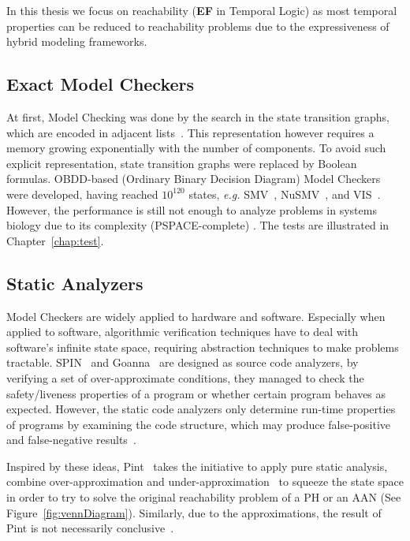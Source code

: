 In this thesis we focus on reachability (\textbf{EF} in Temporal Logic) as most temporal properties can be reduced to reachability problems due to the expressiveness of hybrid modeling frameworks.

\subsection{Exact Model Checkers}
At first, Model Checking was done by the search in the state transition graphs, which are encoded in adjacent lists~\cite{clarke1981design}.
This representation however requires a memory growing exponentially with the number of components.
To avoid such explicit representation, state transition graphs were replaced by Boolean formulas.
OBDD-based (Ordinary Binary Decision Diagram) Model Checkers were developed, having reached $10^{120}$ states, \textit{e.g.}
SMV~\cite{mcmillan1993symbolic}, NuSMV~\cite{cimatti2000nusmv}, and VIS~\cite{brayton1996vis}.
However, the performance is still not enough to analyze problems in systems biology due to its complexity (PSPACE-complete) \cite{harel2002complexity}.
The tests are illustrated in Chapter~\ref{chap:test}.  

\subsection{Static Analyzers}
Model Checkers are widely applied to hardware and software.
Especially when applied to software, algorithmic verification techniques have
to deal with software’s infinite state space, requiring abstraction techniques to make problems tractable.
SPIN~\cite{holzmann1997model} and Goanna~\cite{fehnker2006goanna} are designed as source code analyzers, by verifying a set of over-approximate conditions, they managed to check the safety/liveness properties of a program or whether certain program behaves as expected. 
However, the static code analyzers only determine run-time properties of programs by examining the code structure, which may produce false-positive and false-negative results~\cite{vorobyov2010comparing}.

Inspired by these ideas, Pint~\cite{Pint} takes the initiative to apply pure static analysis, combine over-approximation and under-approximation~\cite{pauleve2012} to squeeze the state space in order to try to solve the original reachability problem of a PH or an AAN (See Figure~\ref{fig:vennDiagram}).
Similarly, due to the approximations, the result of Pint is not necessarily conclusive~\cite{folschette2015}.

